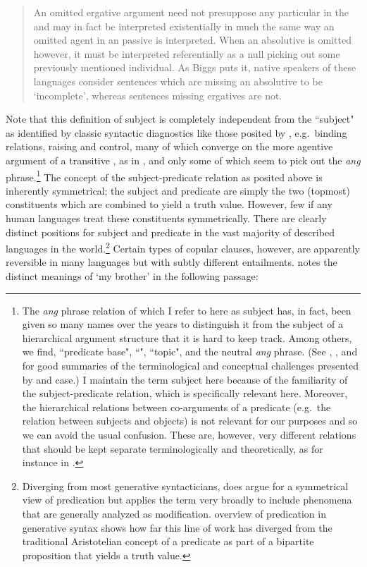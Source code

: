 \documentclass[output=paper]{langsci/langscibook}
\begin{document}
\begin{quote}\small An omitted ergative argument need not presuppose any particular  in the  and may in fact be interpreted existentially in much the same way an omitted agent in an  passive is interpreted. When an absolutive is omitted however, it must be interpreted referentially as a null  picking out some previously mentioned individual. As Biggs puts it, native speakers of these languages consider sentences which are missing an absolutive to be `incomplete', whereas sentences missing ergatives are not.\end{quote}

\noindent
Note that this definition of subject is completely independent from the ``subject" as identified by classic syntactic diagnostics like those posited by \citet{Keenan:1976}, e.g.\ binding relations, raising and control, many of which converge on the more agentive argument of a transitive , as in , and only some of which seem to pick out the \textit{ang} phrase.\footnote{The \textit{ang} phrase relation of  which I refer to here as subject has, in fact, been given so many names over the years to distinguish it from the subject of a hierarchical argument structure that it is hard to keep track. Among others, we find, ``predicate base", ``", ``topic", and the neutral \textit{ang} phrase. (See \citealt{Blust:2002b}, \citealt{Ross:2006}, \citealt{Kroeger:2007} and \citealt{Blust:2015} for good summaries of the terminological and conceptual challenges presented by   and case.) I maintain the term subject here because of the familiarity of the subject-predicate relation, which is specifically relevant here. Moreover, the hierarchical relations between co-arguments of a predicate (e.g.\ the relation between subjects and objects) is not relevant for our purposes and so we can avoid the usual confusion. These are, however, very different relations that should be kept separate terminologically and theoretically, as for instance in \citet{Foley:1984}.} The concept of the subject-predicate relation as posited above is inherently symmetrical; the subject and predicate are simply the two (topmost) constituents which are combined to yield a truth value. However, few if any human languages treat these constituents symmetrically. There are clearly distinct positions for subject and predicate in the vast majority of described languages in the world.\footnote{Diverging from most generative syntacticians, \citet{Dikken:2006a} does argue for a symmetrical view of predication but applies the term very broadly to include phenomena that are generally analyzed as modification.  overview of predication in generative syntax shows how far this line of work has diverged from the traditional Aristotelian concept of a predicate as part of a bipartite proposition that yields a truth value.} Certain types of copular clauses, however, are apparently reversible in many languages but with subtly different entailments. \citet{Jespersen:1937, Jespersen:1965} notes the distinct meanings of `my brother' in the following passage:
\end{document}
